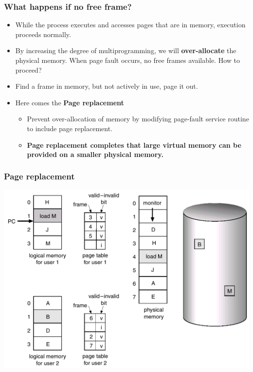 \documentclass[CJKutf8,xcolor=pdftex,dvipsnames,table]{beamer}
\begin{document}
\begin{CJK*}{UTF8}{song}
  \begin{frame}
    \frametitle{What happens if no free frame?} \pause
    \begin{itemize}
    \item{While the process executes and accesses pages that are in memory, execution proceeds normally.} \pause
    \item{By increasing the degree of multiprogramming, we will \textbf{over-allocate} the physical memory. When page fault occurs, no free frames available. How to proceed?} \pause
    \item{Find a frame in memory, but not actively in use, page it out.} \pause
    \item{Here comes the \textbf{Page replacement}} \pause
      \begin{itemize}
      \item{Prevent over-allocation of memory by modifying page-fault service routine to include page replacement.} \pause
      \item{\textbf{Page replacement completes that large virtual memory can be provided on a smaller physical memory.}}
      \end{itemize}
    \end{itemize}
  \end{frame}
  
  \begin{frame}
    \frametitle{Page replacement} \pause
    \begin{center}
      \includegraphics[scale=.3]{v6f10-6}
    \end{center}
  \end{frame}
  

\end{CJK*}
\end{document}
